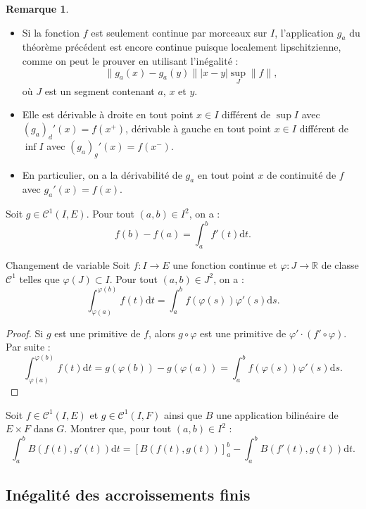 \documentclass[french]{article}
\newcommand{\R}{\mathbb{R}}
\renewcommand{\d}{\text{d}}
\theoremstyle{plain}
\theoremstyle{definition}
\newtheorem*{rmq}{Remarque}
\theoremstyle{remark}
\begin{document}
\begin{rmq}
	\begin{itemize}
		\item Si la fonction $f$ est seulement continue par morceaux sur $I$, l'application $g_a$ du théorème précédent est encore continue puisque localement lipschitzienne, comme on peut le prouver en utilisant l'inégalité :
		$$\lVert g_a(x)-g_a(y)\rVert \lvert x-y\rvert\underset{J}{\sup}\lVert f\rVert,$$
		où $J$ est un segment contenant $a$, $x$ et $y$.
		\item Elle est dérivable à droite en tout point $x\in I$ différent de $\sup I$ avec $(g_a)_d'(x)=f(x^+)$, dérivable à gauche en tout point $x\in I$ différent de $\inf I$ avec $(g_a)_g'(x)=f(x^-)$.
		\item En particulier, on a la dérivabilité de $g_a$ en tout point $x$ de continuité de $f$ avec $g_a'(x)=f(x)$.
	\end{itemize}
\end{rmq}

\begin{cor}%
	Soit $g\in\mathcal{C}^1(I,E)$. Pour tout $(a,b)\in I^2$, on a :
	$$f(b)-f(a)=\int_{a}^{b}f'(t)\d t.$$
\end{cor}

\begin{thm}{Changement de variable}%
	Soit $f:I\to E$ une fonction continue et $\varphi:J\to\R$ de classe $\mathcal{C}^1$ telles que $\varphi(J)\subset I$. Pour tout $(a,b)\in J^2$, on a :
	$$\int_{\varphi(a)}^{\varphi(b)}f(t)\d t=\int_{a}^{b}f(\varphi(s))\varphi'(s)\d s.$$
\end{thm}
\begin{proof}
	Si $g$ est une primitive de $f$, alors $g\circ\varphi$ est une primitive de $\varphi'\cdot(f'\circ \varphi)$. Par suite :
	$$\int_{\varphi(a)}^{\varphi(b)}f(t)\d t=g(\varphi(b))-g(\varphi(a))=\int_{a}^{b}f(\varphi(s))\varphi'(s)\d s.$$
\end{proof}

\begin{exo}
	Soit $f\in\mathcal{C}^1(I,E)$ et $g\in\mathcal{C}^1(I,F)$ ainsi que $B$ une application bilinéaire de $E\times F$ dans $G$. Montrer que, pour tout $(a,b)\in I^2$ :
	$$\int_{a}^{b}B(f(t),g'(t))\d t=\left[B(f(t),g(t))\right]_a^b-\int_{a}^{b}B(f'(t),g(t))\d t.$$
\end{exo}

\subsection{Inégalité des accroissements finis}
\end{document}

